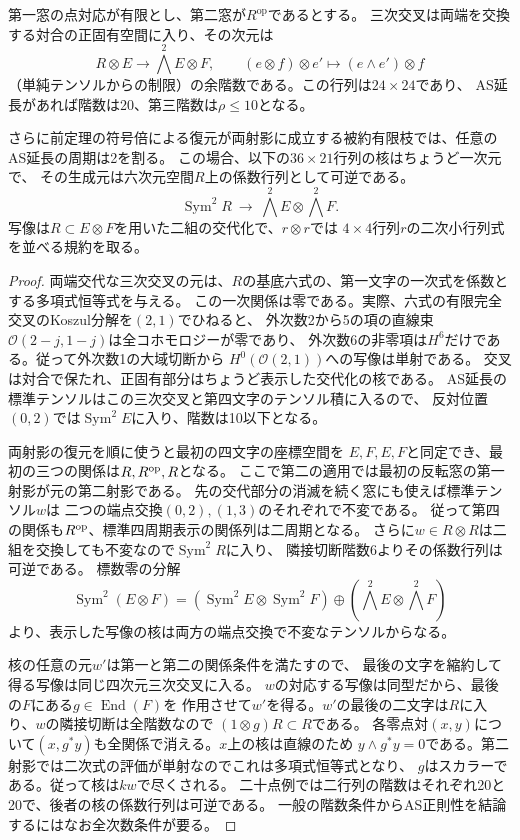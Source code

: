 \begin{proposition}[反転する二窓の障害と二周期性]\label{prop:finite-flip-obstructions}
第一窓の点対応が有限とし、第二窓が$R^{\mathrm{op}}$であるとする。
三次交叉は両端を交換する対合の正固有空間に入り、その次元は
\[
 R\otimes E\longrightarrow \bigwedge^2 E\otimes F,\qquad
 (e\otimes f)\otimes e'\longmapsto(e\wedge e')\otimes f
\]
（単純テンソルからの制限）の余階数である。この行列は$24\times24$であり、
AS延長があれば階数は20、第三階数は$\rho\le10$となる。

さらに前定理の符号倍による復元が両射影に成立する被約有限枝では、任意のAS延長の周期は2を割る。
この場合、以下の$36\times21$行列の核はちょうど一次元で、
その生成元は六次元空間$R$上の係数行列として可逆である。
\[
 \operatorname{Sym}^2 R\ \longrightarrow\
 \bigwedge^2 E\otimes\bigwedge^2 F .
\]
写像は$R\subset E\otimes F$を用いた二組の交代化で、$r\otimes r$では
$4\times4$行列$r$の二次小行列式を並べる規約を取る。
\end{proposition}
\begin{proof}
両端交代な三次交叉の元は、$R$の基底六式の、第一文字の一次式を係数とする多項式恒等式を与える。
この一次関係は零である。実際、六式の有限完全交叉のKoszul分解を$(2,1)$でひねると、
外次数2から5の項の直線束$\mathcal O(2-j,1-j)$は全コホモロジーが零であり、
外次数6の非零項は$H^6$だけである。従って外次数1の大域切断から
$H^0(\mathcal O(2,1))$への写像は単射である。
交叉は対合で保たれ、正固有部分はちょうど表示した交代化の核である。
AS延長の標準テンソルはこの三次交叉と第四文字のテンソル積に入るので、
反対位置$(0,2)$では$\operatorname{Sym}^2 E$に入り、階数は10以下となる。

両射影の復元を順に使うと最初の四文字の座標空間を
$E,F,E,F$と同定でき、最初の三つの関係は$R,R^{\rm op},R$となる。
ここで第二の適用では最初の反転窓の第一射影が元の第二射影である。
先の交代部分の消滅を続く窓にも使えば標準テンソル$w$は
二つの端点交換$(0,2),(1,3)$のそれぞれで不変である。
従って第四の関係も$R^{\rm op}$、標準四周期表示の関係列は二周期となる。
さらに$w\in R\otimes R$は二組を交換しても不変なので$\operatorname{Sym}^2 R$に入り、
隣接切断階数6よりその係数行列は可逆である。
標数零の分解
\[
 \operatorname{Sym}^2(E\otimes F)=
 (\operatorname{Sym}^2 E\otimes\operatorname{Sym}^2 F)
 \oplus(\bigwedge^2 E\otimes\bigwedge^2 F)
\]
より、表示した写像の核は両方の端点交換で不変なテンソルからなる。

核の任意の元$w'$は第一と第二の関係条件を満たすので、
最後の文字を縮約して得る写像は同じ四次元三次交叉に入る。
$w$の対応する写像は同型だから、最後の$F$にある$g\in\operatorname{End}(F)$を
作用させて$w'$を得る。$w'$の最後の二文字は$R$に入り、$w$の隣接切断は全階数なので
$(1\otimes g)R\subset R$である。
各零点対$(x,y)$について$(x,g^*y)$も全関係で消える。$x$上の核は直線のため
$y\wedge g^*y=0$である。第二射影では二次式の評価が単射なのでこれは多項式恒等式となり、
$g$はスカラーである。従って核は$kw$で尽くされる。
二十点例では二行列の階数はそれぞれ20と20で、後者の核の係数行列は可逆である。
一般の階数条件からAS正則性を結論するにはなお全次数条件が要る。
\end{proof}
